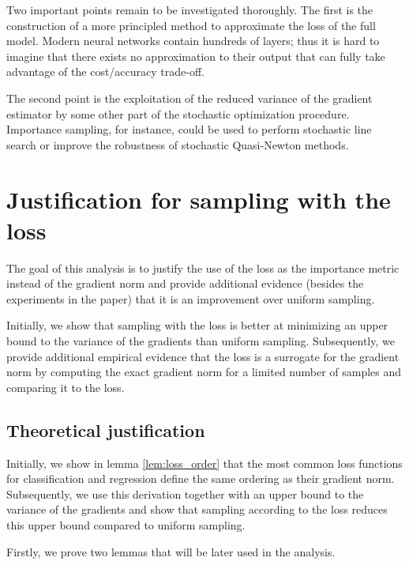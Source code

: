 \documentclass{article}
\begin{document}
Two important points remain to be investigated thoroughly. The first is the
construction of a more principled method to approximate the loss of the full
model. Modern neural networks contain hundreds of layers; thus it is hard to
imagine that there exists no approximation to their output that can fully take
advantage of the cost/accuracy trade-off.

The second point is the exploitation of the reduced variance of the gradient
estimator by some other part of the stochastic optimization procedure.
Importance sampling, for instance, could be used to perform stochastic line
search or improve the robustness of stochastic Quasi-Newton methods.





\clearpage

\appendix
\section{Justification for sampling with the loss}

The goal of this analysis is to justify the use of the loss as the importance
metric instead of the gradient norm and provide additional evidence (besides
the experiments in the paper) that it is an improvement over uniform sampling.

Initially, we show that sampling with the loss is better at minimizing an upper
bound to the variance of the gradients than uniform sampling.  Subsequently, we
provide additional empirical evidence that the loss is a surrogate for the
gradient norm by computing the exact gradient norm for a limited number of
samples and comparing it to the loss.

\subsection{Theoretical justification} \label{sec:theoretical}

Initially, we show in lemma \ref{lem:loss_order} that the most common loss
functions for classification and regression define the same ordering as their
gradient norm. Subsequently, we use this derivation together with an upper
bound to the variance of the gradients and show that sampling according to the
loss reduces this upper bound compared to uniform sampling.

Firstly, we prove two lemmas that will be later used in the analysis.
\end{document}

